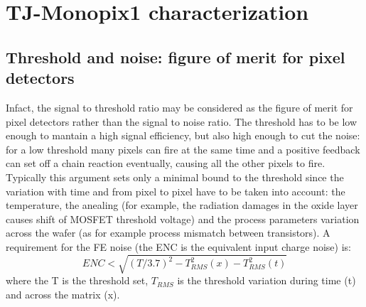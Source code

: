 
\section{TJ-Monopix1 characterization}
    \subsection{Threshold and noise: figure of merit for pixel detectors}
        Infact, the signal to threshold ratio may be considered as the figure of merit for pixel detectors rather than the signal to noise ratio.
        The threshold has to be low enough to mantain a high signal efficiency, but also high enough to cut the noise: for a low threshold many pixels can fire at the same time and a positive feedback can set off a chain reaction eventually, causing all the other pixels to fire. 
        Typically this argument sets only a minimal bound to the threshold since the variation with time and from pixel to pixel have to be taken into account: the temperature, the anealing (for example, the radiation damages in the oxide layer causes shift of MOSFET threshold voltage) and the process parameters variation across the wafer (as for example process mismatch between transistors). 
        A requirement for the FE noise (the ENC is the equivalent input charge noise) is: 
        \begin{equation}
            ENC < \sqrt{(T/3.7)^2 - T_{RMS} ^2 (x) - T_{RMS} ^2 (t)}
        \end{equation}
        where the T is the threshold set, $T_{RMS}$ is the threshold variation during time (t) and across the matrix (x).


